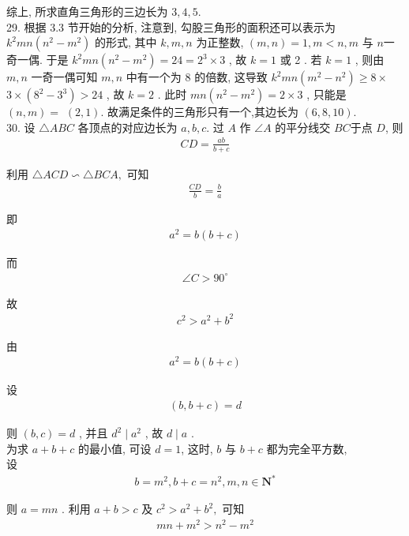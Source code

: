 综上, 所求直角三角形的三边长为 $3,4,5$.\\
29. 根据 3.3 节开始的分析, 注意到, 勾股三角形的面积还可以表示为\\
$k^{2} m n\left(n^{2}-m^{2}\right)$ 的形式, 其中 $k ,  m ,  n$ 为正整数,  $(m, n)=1, m<n, m$ 与 $n$一奇一偶. 于是 $k^{2} m n\left(n^{2}-m^{2}\right)=24=2^{3} \times 3$ , 故 $k=1$ 或 2 . 若 $k=1$ , 则由 $m ,  n$ 一奇一偶可知 $m ,  n$ 中有一个为 8 的倍数, 这导致 $k^{2} m n\left(m^{2}-n^{2}\right) \geqslant 8 \times$ $3 \times\left(8^{2}-3^{3}\right)>24$ , 故 $k=2$ . 此时 $m n\left(n^{2}-m^{2}\right)=2 \times 3$ , 只能是 $(n, m)=$ $(2,1)$. 故满足条件的三角形只有一个,其边长为 $(6,8,10)$.\\
30. 设 $\triangle A B C$ 各顶点的对应边长为 $a ,  b ,  c$. 过 $A$ 作 $\angle A$ 的平分线交 $B C$于点 $D$, 则
\begin{align*}
	C D=\frac{a b}{b+c}
\end{align*}

利用 $\triangle A C D \backsim \triangle B C A , $ 可知
\begin{align*}
	\frac{C D}{b}=\frac{b}{a}
\end{align*}

即
\begin{align*}
	a^{2}=b(b+c)
\end{align*}

而
\begin{align*}
	\angle C>90^{\circ}
\end{align*}

故
\begin{align*}
	c^{2}>a^{2}+b^{2}
\end{align*}

由
\begin{align*}
	a^{2}=b(b+c)
\end{align*}

设
\begin{align*}
	(b, b+c)=d
\end{align*}

则 $(b, c)=d$ , 并且 $d^{2} \mid a^{2}$ , 故 $d \mid a$ . \\
为求 $a+b+c$ 的最小值, 可设 $d=1$, 这时, $b$ 与 $b+c$ 都为完全平方数,\\
设
\begin{align*}
	b=m^{2}, b+c=n^{2}, m, n \in \mathbf{N}^{*}
\end{align*}

则 $a=m n$ . 利用 $a+b>c$ 及 $c^{2}>a^{2}+b^{2} , $ 可知
\begin{align*}
	m n+m^{2}>n^{2}-m^{2}
\end{align*}

